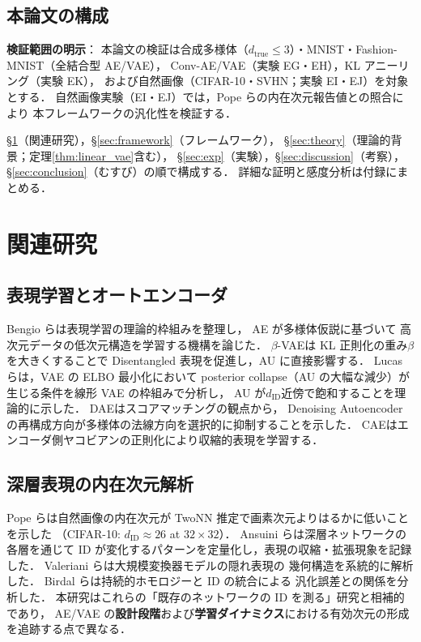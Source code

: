 \documentclass[11pt,a4paper]{jsarticle}
\begin{document}
\subsection{本論文の構成}\label{sec:intro_structure}

\textbf{検証範囲の明示}：
本論文の検証は合成多様体（$d_{\mathrm{true}} \leq 3$）・MNIST・Fashion-MNIST（全結合型 AE/VAE），
Conv-AE/VAE（実験 EG・EH），KL アニーリング（実験 EK），
および自然画像（CIFAR-10・SVHN；実験 EI・EJ）を対象とする．
自然画像実験（EI・EJ）では，Pope ら\cite{pope2021intrinsic}の内在次元報告値との照合により
本フレームワークの汎化性を検証する．

§\ref{sec:related}（関連研究），§\ref{sec:framework}（フレームワーク），
§\ref{sec:theory}（理論的背景；定理\ref{thm:linear_vae}含む），
§\ref{sec:exp}（実験），§\ref{sec:discussion}（考察），§\ref{sec:conclusion}（むすび）の順で構成する．
詳細な証明と感度分析は付録にまとめる．

\section{関連研究}\label{sec:related}

\subsection{表現学習とオートエンコーダ}\label{sec:related_ae}

Bengio ら\cite{bengio2013representation}は表現学習の理論的枠組みを整理し，
AE が多様体仮説\cite{fefferman2016manifold}に基づいて
高次元データの低次元構造を学習する機構を論じた．
$\beta$-VAE\cite{higgins2017betavae}は KL 正則化の重み$\beta$を大きくすることで
Disentangled 表現を促進し，AU に直接影響する．
Lucas ら\cite{lucas2019elbo}は，VAE の ELBO 最小化において
posterior collapse（AU の大幅な減少）が生じる条件を線形 VAE の枠組みで分析し，
AU が$d_{\mathrm{ID}}$近傍で飽和することを理論的に示した．
DAE\cite{alain2014dae}はスコアマッチングの観点から，
Denoising Autoencoder の再構成方向が多様体の法線方向を選択的に抑制することを示した．
CAE\cite{rifai2011cae}はエンコーダ側ヤコビアンの正則化により収縮的表現を学習する．

\subsection{深層表現の内在次元解析}\label{sec:related_id}

Pope ら\cite{pope2021intrinsic}は自然画像の内在次元が
TwoNN 推定で画素次元よりはるかに低いことを示した
（CIFAR-10: $d_\mathrm{ID} \approx 26$ at $32 \times 32$）．
Ansuini ら\cite{ansuini2019intrinsic}は深層ネットワークの各層を通じて
ID が変化するパターンを定量化し，表現の収縮・拡張現象を記録した．
Valeriani ら\cite{valeriani2023geometry}は大規模変換器モデルの隠れ表現の
幾何構造を系統的に解析した．
Birdal ら\cite{birdal2021intrinsic}は持続的ホモロジーと ID の統合による
汎化誤差との関係を分析した．
本研究はこれらの「既存のネットワークの ID を測る」研究と相補的であり，
AE/VAE の\textbf{設計段階}および\textbf{学習ダイナミクス}における有効次元の形成を追跡する点で異なる．
\end{document}
